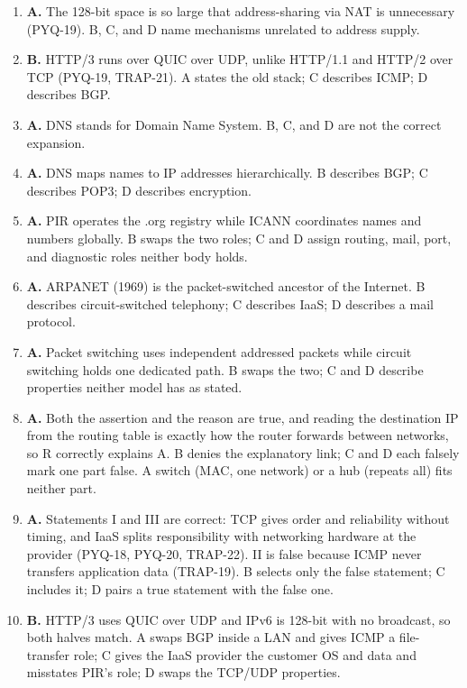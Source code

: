 \documentclass[11pt]{article}
\begin{document}
\begin{enumerate}[label=\textbf{Q\arabic*.}, leftmargin=*]
  claim; C uses the 256-bit distractor with a broadcast; D mislabels IPv6 as
  a routing protocol.
\item \textbf{A.} The 128-bit space is so large that address-sharing via NAT
  is unnecessary (PYQ-19). B, C, and D name mechanisms unrelated to address
  supply.
\item \textbf{B.} HTTP/3 runs over QUIC over UDP, unlike HTTP/1.1 and HTTP/2
  over TCP (PYQ-19, TRAP-21). A states the old stack; C describes ICMP; D
  describes BGP.
\item \textbf{A.} DNS stands for Domain Name System. B, C, and D are not the
  correct expansion.
\item \textbf{A.} DNS maps names to IP addresses hierarchically. B describes
  BGP; C describes POP3; D describes encryption.
\item \textbf{A.} PIR operates the .org registry while ICANN coordinates
  names and numbers globally. B swaps the two roles; C and D assign routing,
  mail, port, and diagnostic roles neither body holds.
\item \textbf{A.} ARPANET (1969) is the packet-switched ancestor of the
  Internet. B describes circuit-switched telephony; C describes IaaS; D
  describes a mail protocol.
\item \textbf{A.} Packet switching uses independent addressed packets while
  circuit switching holds one dedicated path. B swaps the two; C and D
  describe properties neither model has as stated.
\item \textbf{A.} Both the assertion and the reason are true, and reading the
  destination IP from the routing table is exactly how the router forwards
  between networks, so R correctly explains A. B denies the explanatory link;
  C and D each falsely mark one part false. A switch (MAC, one network) or a
  hub (repeats all) fits neither part.
\item \textbf{A.} Statements I and III are correct: TCP gives order and
  reliability without timing, and IaaS splits responsibility with networking
  hardware at the provider (PYQ-18, PYQ-20, TRAP-22). II is false because
  ICMP never transfers application data (TRAP-19). B selects only the false
  statement; C includes it; D pairs a true statement with the false one.
\item \textbf{B.} HTTP/3 uses QUIC over UDP and IPv6 is 128-bit with no
  broadcast, so both halves match. A swaps BGP inside a LAN and gives ICMP a
  file-transfer role; C gives the IaaS provider the customer OS and data and
  misstates PIR's role; D swaps the TCP/UDP properties.


\end{enumerate}
\end{document}
